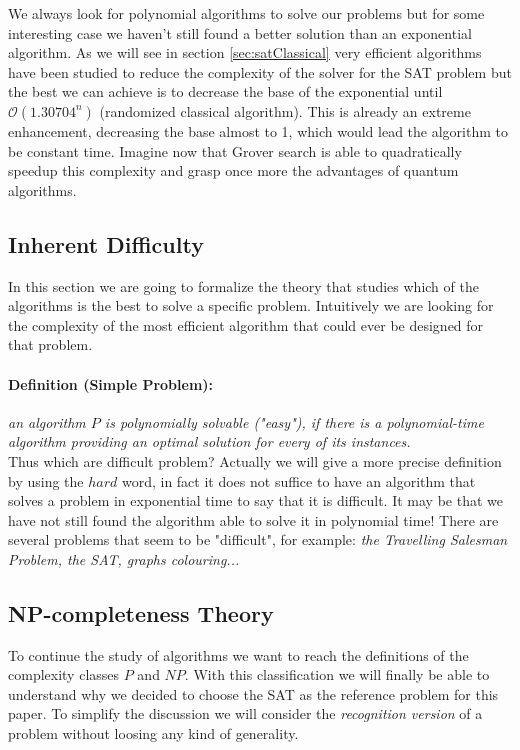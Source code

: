 \documentclass[english]{article}
\begin{document}
			We always look for polynomial algorithms to solve our problems but for some interesting case we haven't still found a better solution than an exponential algorithm. As we will see in section \ref{sec:satClassical} very efficient algorithms have been studied to reduce the complexity of the solver for the SAT problem but the best we can achieve is to decrease the base of the exponential until $\mathcal{O}(1.30704^n)$ (randomized classical algorithm). This is already an extreme enhancement, decreasing the base almost to 1, which would lead the algorithm to be constant time. Imagine now that Grover search is able to quadratically speedup this complexity and grasp once more the advantages of quantum algorithms.
		
		\subsection{Inherent Difficulty}
		\label{sec:inherentDifficulty}
			In this section we are going to formalize the theory that studies which of the algorithms is the best to solve a specific problem. Intuitively we are looking for the complexity of the most efficient algorithm that could ever be designed for that problem.
			
			\paragraph{Definition (Simple Problem):} \emph{an algorithm $P$ is polynomially solvable ("easy"), if there is a polynomial-time algorithm providing an optimal solution for every of its instances.} \\
			
			Thus which are difficult problem? Actually we will give a more precise definition by using the $hard$ word, in fact it does not suffice to have an algorithm that solves a problem in exponential time to say that it is difficult. It may be that we have not still found the algorithm able to solve it in polynomial time! There are several problems that seem to be "difficult", for example: \emph{the Travelling Salesman Problem, the SAT, graphs colouring...}
		
		\subsection{NP-completeness Theory}
		\label{sec:npCompleteness}
			To continue the study of algorithms we want to reach the definitions of the complexity classes $P$ and $NP$. With this classification we will finally be able to understand why we decided to choose the SAT as the reference problem for this paper. To simplify the discussion we will consider the \emph{recognition version} of a problem without loosing any kind of generality.
			
\end{document}
